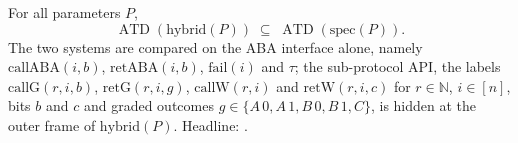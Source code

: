 \begin{theorem}
  \label{thm:aba-hybrid-spec}
  \leanok
  For all parameters $P$,
  \[
    \operatorname{ATD}(\mathrm{hybrid}(P)) \;\subseteq\;
    \operatorname{ATD}(\mathrm{spec}(P)).
  \]
  The two systems are compared on the ABA interface alone, namely $\mathrm{callABA}(i,b)$, $\mathrm{retABA}(i,b)$, $\mathrm{fail}(i)$ and $\tau$; the sub-protocol API, the labels $\mathrm{callG}(r,i,b)$, $\mathrm{retG}(r,i,g)$, $\mathrm{callW}(r,i)$ and $\mathrm{retW}(r,i,c)$ for $r \in \mathbb{N}$, $i \in [n]$, bits $b$ and $c$ and graded outcomes $g \in \{A\,0, A\,1, B\,0, B\,1, C\}$, is hidden at the outer frame of $\mathrm{hybrid}(P)$.
  Headline: .
\end{theorem}

